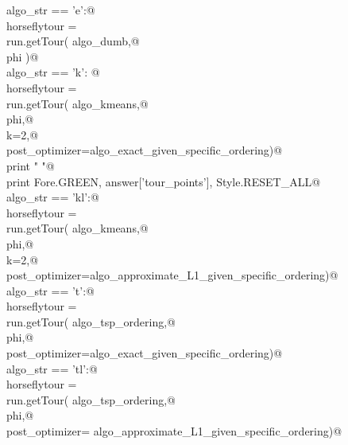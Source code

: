 \documentclass[11.5pt]{report}
\begin{document}
\begin{flushleft}
\begin{list}{}{}
\mbox{}\verb@if   algo_str == 'e':@\\
\mbox{}\verb@      horseflytour = \@\\
\mbox{}\verb@             run.getTour( algo_dumb,@\\
\mbox{}\verb@                          phi )@\\
\mbox{}\verb@elif algo_str == 'k': @\\
\mbox{}\verb@      horseflytour = \@\\
\mbox{}\verb@             run.getTour( algo_kmeans,@\\
\mbox{}\verb@                          phi,@\\
\mbox{}\verb@                          k=2,@\\
\mbox{}\verb@                          post_optimizer=algo_exact_given_specific_ordering)@\\
\mbox{}\verb@      print " "@\\
\mbox{}\verb@      print Fore.GREEN, answer['tour_points'], Style.RESET_ALL@\\
\mbox{}\verb@elif algo_str == 'kl':@\\
\mbox{}\verb@      horseflytour = \@\\
\mbox{}\verb@             run.getTour( algo_kmeans,@\\
\mbox{}\verb@                          phi,@\\
\mbox{}\verb@                          k=2,@\\
\mbox{}\verb@                          post_optimizer=algo_approximate_L1_given_specific_ordering)@\\
\mbox{}\verb@elif algo_str == 't':@\\
\mbox{}\verb@      horseflytour = \@\\
\mbox{}\verb@             run.getTour( algo_tsp_ordering,@\\
\mbox{}\verb@                          phi,@\\
\mbox{}\verb@                          post_optimizer=algo_exact_given_specific_ordering)@\\
\mbox{}\verb@elif algo_str == 'tl':@\\
\mbox{}\verb@      horseflytour = \@\\
\mbox{}\verb@             run.getTour( algo_tsp_ordering,@\\
\mbox{}\verb@                          phi,@\\
\mbox{}\verb@                          post_optimizer= algo_approximate_L1_given_specific_ordering)@\\

\end{list}
\end{flushleft}
\end{document}
